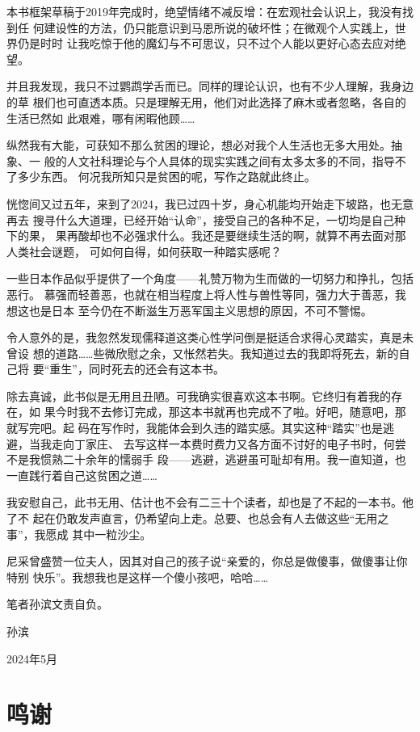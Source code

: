 本书框架草稿于2019年完成时，绝望情绪不减反增：在宏观社会认识上，我没有找到任
何建设性的方法，仍只能意识到马恩所说的破坏性；在微观个人实践上，世界仍是时时
让我吃惊于他的魔幻与不可思议，只不过个人能以更好心态去应对绝望。

并且我发现，我只不过鹦鹉学舌而已。同样的理论认识，也有不少人理解，我身边的草
根们也可直透本质。只是理解无用，他们对此选择了麻木或者忽略，各自的生活已然如
此艰难，哪有闲暇他顾……

纵然我有大能，可获知不那么贫困的理论，想必对我个人生活也无多大用处。抽象、一
般的人文社科理论与个人具体的现实实践之间有太多太多的不同，指导不了多少东西。
何况我所知只是贫困的呢，写作之路就此终止。

恍惚间又过五年，来到了2024，我已过四十岁，身心机能均开始走下坡路，也无意再去
搜寻什么大道理，已经开始“认命”，接受自己的各种不足，一切均是自己种下的果，
果再酸却也不必强求什么。我还是要继续生活的啊，就算不再去面对那人类社会谜题，
可如何自得，如何获取一种踏实感呢？

一些日本作品似乎提供了一个角度——礼赞万物为生而做的一切努力和挣扎，包括恶行。
慕强而轻善恶，也就在相当程度上将人性与兽性等同，强力大于善恶，我想这也是日本
至今仍在不断滋生万恶军国主义思想的原因，不可不警惕。

令人意外的是，我忽然发现儒释道这类心性学问倒是挺适合求得心灵踏实，真是未曾设
想的道路……些微欣慰之余，又怅然若失。我知道过去的我即将死去，新的自己将
要“重生”，同时死去的还会有这本书。

除去真诚，此书似是无用且丑陋。可我确实很喜欢这本书啊。它终归有着我的存在，如
果今时我不去修订完成，那这本书就再也完成不了啦。好吧，随意吧，那就写完吧。起
码在写作时，我能体会到久违的踏实感。其实这种“踏实”也是逃避，当我走向丁家庄、
去写这样一本费时费力又各方面不讨好的电子书时，何尝不是我惯熟二十余年的懦弱手
段——逃避，逃避虽可耻却有用。我一直知道，也一直践行着自己这贫困之道……

我安慰自己，此书无用、估计也不会有二三十个读者，却也是了不起的一本书。他了不
起在仍敢发声直言，仍希望向上走。总要、也总会有人去做这些“无用之事”，我愿成
其中一粒沙尘。


尼采曾盛赞一位夫人，因其对自己的孩子说“亲爱的，你总是做傻事，做傻事让你特别
快乐”。我想我也是这样一个傻小孩吧，哈哈……

笔者孙滨文责自负。

{\raggedleft

孙滨 \qquad\qquad \par

2024年5月 \quad}

\chapter{鸣谢}

